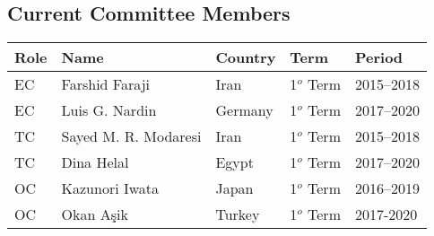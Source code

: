 \documentclass{article}
\begin{document}
\subsection{Current Committee Members}
\begin{table}[H]
\begin{tabular}{lllll}
  \toprule
  \textbf{Role}   & \textbf{Name}         & \textbf{Country}  & \textbf{Term} &
  \textbf{Period}\\
    \midrule
    EC            & Farshid Faraji        & Iran              & 1${^o}$ Term  &
    2015--2018\\
    \hline
    EC            & Luis G. Nardin        & Germany           & 1${^o}$ Term  &
    2017--2020\\
    \hline
    TC            & Sayed M. R. Modaresi  & Iran              & 1${^o}$ Term  &
    2015--2018\\
    \hline
    TC            & Dina Helal            & Egypt             & 1${^o}$ Term  &
    2017--2020\\
    \hline
    OC            & Kazunori Iwata        & Japan             & 1${^o}$ Term  &
    2016--2019\\
    \hline
    OC            & Okan A{\c s}ik        & Turkey            & 1${^o}$ Term  &
    2017-2020\\
    \bottomrule
\end{tabular}
\end{table}
\end{document}
